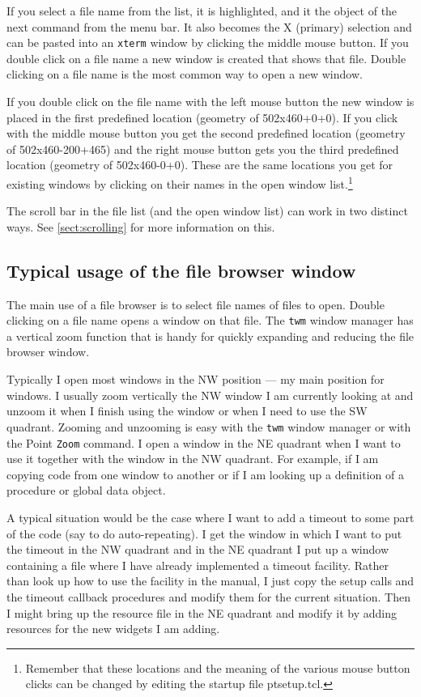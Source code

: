 If you select a file name from the list, it is highlighted,
and it the object of the next command from the menu bar.
It also becomes the X (primary) selection and can be pasted
into an {\tt xterm} window by clicking the middle mouse button.
If you double click on a file name a new window is created
that shows that file.
Double clicking on a file name is the most common way to open a new window.

If you double click on the file name with the left
mouse button the new window is placed in the first predefined
location (geometry of 502x460+0+0).
If you click with the middle mouse button you get the second
predefined location (geometry of 502x460-200+465) and the right mouse
button gets you the third predefined location (geometry of 502x460-0+0).
These are the same locations you get for existing windows by clicking
on their names in the open window list.\footnote{
Remember that these locations and the meaning of the various mouse
button clicks can be changed by editing the startup file ptsetup.tcl.}

The scroll bar in the file list (and the open window list) can
work in two distinct ways.
See \ref{sect:scrolling} for more information on this.



\subsection{Typical usage of the file browser window}

The main use of a file browser is to select file names of files to open.
Double clicking on a file name opens a window on that file.
The {\tt twm} window manager has a vertical zoom function
that is handy for quickly expanding and reducing
the file browser window.

Typically I open most windows in the NW position ---
my main position for windows.
I usually zoom vertically the NW window I am currently looking at and unzoom
it when I finish using the window or
when I need to use the SW quadrant.
Zooming and unzooming is easy with the {\tt twm} window manager
or with the Point {\tt Zoom} command.
I open a window in the NE quadrant when I want to use it
together with the window in the NW quadrant.
For example, if I am copying code from one window to another
or if I am looking up a definition of a procedure or global
data object.

A typical situation would be the case where I want to add a
timeout to some part of the code (say to do auto-repeating).
I get the window in which I want to put the timeout in the NW quadrant
and in the NE quadrant I put up a window containing a file where
I have already implemented a timeout facility.
Rather than look up how to use the facility in the manual,
I just copy the setup calls and the timeout callback procedures
and modify them for the current situation.
Then I might bring up the resource file in the NE quadrant
and modify it by adding resources for the new widgets I am adding.

